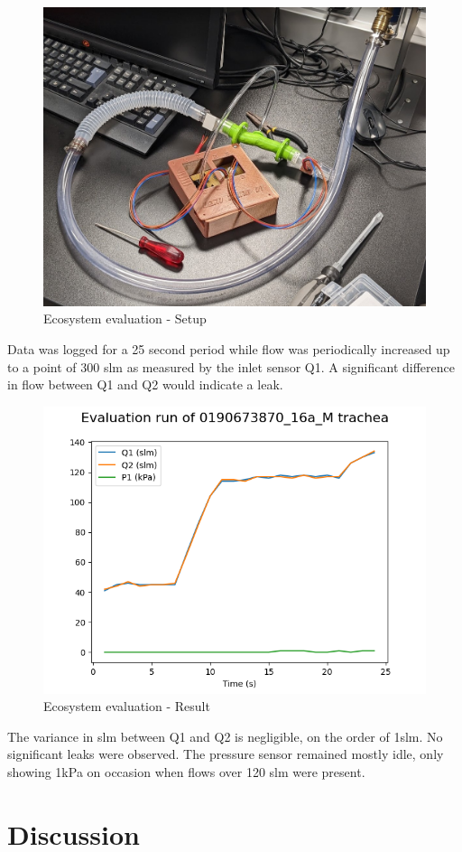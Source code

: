 \documentclass[MME,Projekt,english]{twbook}%
\begin{document}
\begin{figure}[!htbp]
	\centering
	\includegraphics[width=.6\linewidth]{images/eval-setup-irl.jpg}
	\caption{Ecosystem evaluation - Setup}\label{eval-setup-irl}
\end{figure}

Data was logged for a 25 second period while flow was periodically increased up to a point of 300 slm as measured by the inlet sensor Q1. A significant
difference in flow between Q1 and Q2 would indicate a leak.

\begin{figure}[!htbp]
	\centering
	\includegraphics[width=.8\linewidth]{images/eval-result.png}
	\caption{Ecosystem evaluation - Result}\label{eval-result}
\end{figure}

The variance in slm between Q1 and Q2 is negligible, on the order of 1slm. No significant leaks were observed. The pressure sensor remained mostly idle,
only showing 1kPa on occasion when flows over 120 slm were present.

\chapter{Discussion}
\end{document}
